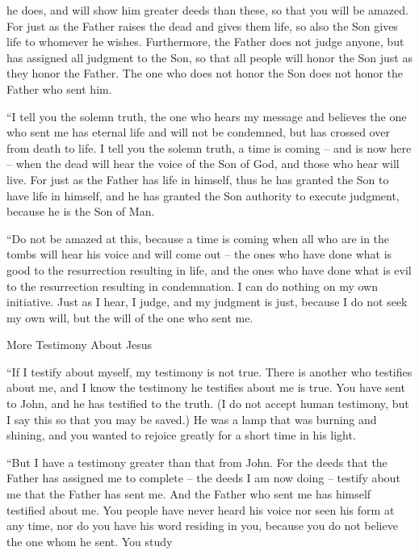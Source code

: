 {he does,
and
will show
him
greater
deeds
than
these,
so that
you
will be amazed.
For
just as
the Father
raises
the dead
and
gives
them life,
so
also
the Son
gives life
to whomever
he wishes.
Furthermore,
the Father
does
not
judge
anyone,
but
has assigned
all
judgment
to the Son,
so that
all people
will honor
the Son
just as
they honor
the Father.
The one who does
not
honor
the Son
does
not
honor
the Father
who sent
him.
\par }{\PP {}“I tell
you
the solemn truth,
the one who hears
my
message
and
believes
the one who sent
me
has
eternal
life
and
will
not
be condemned,
but
has crossed over
from
death
to
life.
I tell
you
the solemn truth,
a time
is coming
– and
is
now here – when the dead will hear the voice of the Son of God, and those who hear will live.
For
just
as the Father
has
life
in
himself,
thus
he has granted
the Son
to have
life
in
himself,
and
he has granted
the Son
authority
to execute
judgment,
because
he is
the Son
of Man.
\par }{\PP {}“Do
not
be amazed
at this,
because
a time
is coming
when all
who are in
the tombs
will hear
his
voice
and
will come out
– the ones who have done
what is good
to
the resurrection
resulting in life,
and the ones who have done
what is evil
to
the resurrection
resulting in condemnation.
I
can
do
nothing
on
my own initiative.
Just
as I hear,
I judge,
and
my
judgment
is
just,
because
I do
not
seek
my own
will,
but
the will
of the one who sent
me.
\par }{\SH More Testimony About Jesus
\par }{\PP {}“If
I
testify
about
myself,
my
testimony
is
not
true.
There is
another
who testifies
about
me,
and
I know
the testimony
he testifies
about
me
is
true.
You
have sent
to
John,
and
he has testified
to the truth.
(I
do
not
accept
human
testimony,
but
I say
this
so that
you
may be saved.)
He
was
a lamp
that was burning
and
shining,
and
you
wanted
to rejoice greatly
for
a short time
in
his
light.
\par }{\PP {}“But
I
have
a testimony
greater than
that from John.
For
the deeds
that
the Father
has assigned
me
to
complete
– the deeds
I am now doing
– testify
about
me
that
the Father
has sent
me.
And
the Father
who sent
me
has
himself
testified
about
me.
You
people have
never
heard
his
voice
nor
seen
his
form
at any time,
nor
do you have
his
word
residing
in
you,
because
you
do
not
believe
the one whom
he sent.
You study
}
